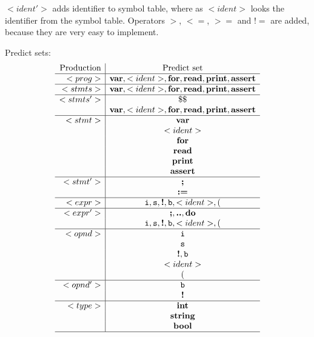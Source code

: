 \documentclass[a4paper,12pt]{article}
\newcommand{\bb}[1]{\textbf{#1}}
\newcommand{\ttt}[1]{\texttt{#1}}
\newcommand{\integer}{\ttt{i}}
\newcommand{\str}{\ttt{s}}
\newcommand{\bool}{\ttt{b}}
\begin{document}
$<ident'>$ adds identifier to symbol table, where as $<ident>$ looks the
identifier from the symbol table. Operators $>$, $<=$, $>=$ and $!=$ are added,
because they are very easy to implement.

Predict sets:
\[
\begin{array}{r|c}
\text{Production} & \text{Predict set} \\
\hline
<prog>   & \bb{var}, <ident>, \bb{for}, \bb{read}, \bb{print}, \bb{assert} \\
\hline
<stmts>  & \bb{var}, <ident>, \bb{for}, \bb{read}, \bb{print}, \bb{assert} \\
\hline
<stmts'> & \$\$ \\
         & \bb{var}, <ident>, \bb{for}, \bb{read}, \bb{print}, \bb{assert} \\
\hline
<stmt>   & \bb{var}  \\
         & <ident>  \\
         & \bb{for}  \\
         & \bb{read}  \\
         & \bb{print}  \\
         & \bb{assert}  \\
\hline
<stmt'>  & \bb{;} \\
         & \bb{:=}  \\
\hline
<expr>   & \integer, \str, \bb{!}, \bool, <ident>, ( \\
\hline
<expr'>  & \bb{;}, \bb{..}, \bb{do} \\
         & \integer, \str, \bb{!}, \bool, <ident>, ( \\ 
\hline
<opnd>   & \integer  \\
         & \str  \\
         & \bb{!}, \bool  \\
         & <ident>  \\
         & (  \\
\hline
<opnd'>  & \bool \\
         & \bb{!}  \\
\hline
<type>   & \bb{int} \\
         & \bb{string} \\
         & \bb{bool} \\
\hline
\end{array}
\]
\end{document}
